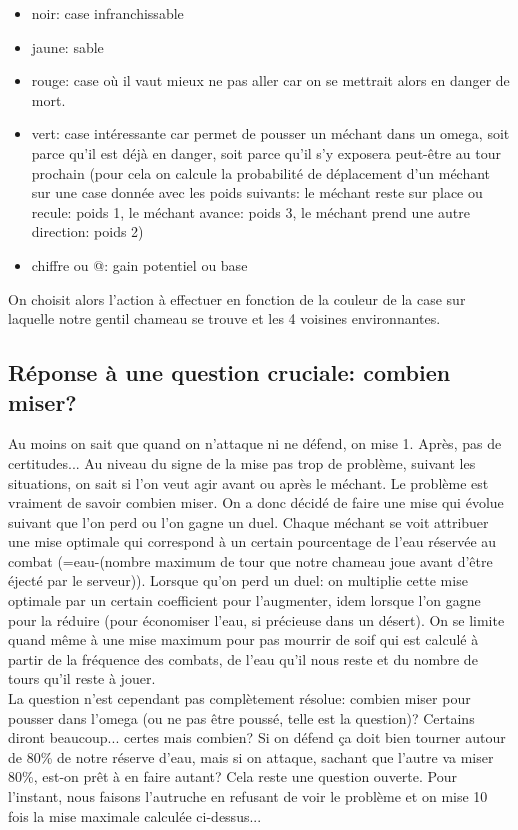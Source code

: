 \documentclass[a4paper,12pt]{article}
\begin{document}
\begin{itemize}
\item noir: case infranchissable
\item jaune: sable
\item rouge: case o\`u il vaut mieux ne pas aller car on se mettrait alors en danger de mort.
\item vert: case int\'eressante car permet de pousser un m\'echant dans un omega, soit parce qu'il est d\'ej\`a en danger, soit parce qu'il s'y exposera peut-\^etre au tour prochain (pour cela on calcule la probabilit\'e de d\'eplacement d'un m\'echant sur une case donn\'ee avec les poids suivants: le m\'echant reste sur place ou recule: poids 1, le m\'echant avance: poids 3, le m\'echant prend une autre direction: poids 2)
\item chiffre ou @: gain potentiel ou base
\end{itemize}
On choisit alors l'action \`a effectuer en fonction de la couleur de la case sur laquelle notre gentil chameau se trouve et les 4 voisines environnantes.
\subsection{R\'eponse \`a une question cruciale: combien miser?}
Au moins on sait que quand on n'attaque ni ne d\'efend, on mise 1. Apr\`es, pas de certitudes... Au niveau du signe de la mise pas trop de probl\`eme, suivant les situations, on sait si l'on veut agir avant ou apr\`es le m\'echant. Le probl\`eme est vraiment de savoir combien miser. On a donc d\'ecid\'e de faire une mise qui \'evolue suivant que l'on perd ou l'on gagne un duel. Chaque m\'echant se voit attribuer une mise optimale qui correspond \`a un certain pourcentage de l'eau r\'eserv\'ee au combat (=eau-(nombre maximum de tour que notre chameau joue avant d'\^etre \'eject\'e par le serveur)). Lorsque qu'on perd un duel: on multiplie cette mise optimale par un certain coefficient pour l'augmenter, idem lorsque l'on gagne pour la r\'eduire (pour \'economiser l'eau, si pr\'ecieuse dans un d\'esert). On se limite quand m\^eme \`a une mise maximum pour pas mourrir de soif qui est calcul\'e \`a partir de la fr\'equence des combats, de l'eau qu'il nous reste et du nombre de tours qu'il reste \`a jouer.\\
La question n'est cependant pas compl\`etement r\'esolue: combien miser pour pousser dans l'omega (ou ne pas \^etre pouss\'e, telle est la question)? Certains diront beaucoup... certes mais combien? Si on d\'efend \c ca doit bien tourner autour de 80\% de notre r\'eserve d'eau, mais si on attaque, sachant que l'autre va miser 80\%, est-on pr\^et \`a en faire autant? Cela reste une question ouverte. Pour l'instant, nous faisons l'autruche en refusant de voir le probl\`eme et on mise 10 fois la mise maximale calcul\'ee ci-dessus...
\end{document}
